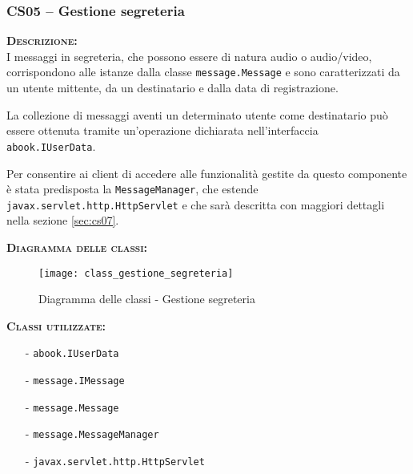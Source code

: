 \subsubsection{CS05 -- Gestione segreteria}\label{sec:cs05}
\begin{description}
	\item{\scshape\bfseries Descrizione:}\\
I messaggi in segreteria, che possono essere di natura audio o audio/video, corrispondono alle istanze dalla classe \texttt{message.Message} e sono caratterizzati da un utente mittente, da un destinatario e dalla data di registrazione.

La collezione di messaggi aventi un determinato utente come destinatario può essere ottenuta tramite un'operazione dichiarata nell'interfaccia \texttt{abook.IUserData}.

Per consentire ai client di accedere alle funzionalità gestite da questo componente è stata predisposta la  \texttt{MessageManager}, che estende \texttt{javax.servlet.http.HttpServlet} e che sarà descritta con maggiori dettagli nella sezione \vref{sec:cs07}.

	\item{\scshape\bfseries Diagramma delle classi:}
\begin{figure}[H]
  \centering
  \texttt{[image: class\_gestione\_segreteria]}
  \caption{Diagramma delle classi - Gestione segreteria}\label{fig:gestionesegreteria}
\end{figure}	
	
	\item{\scshape\bfseries Classi utilizzate:}
	\begin{itemize}[noitemsep,nolistsep]
	  \item[-] \texttt{abook.IUserData}
		\item[-] \texttt{message.IMessage}
	  \item[-] \texttt{message.Message}
	  \item[-] \texttt{message.MessageManager}
	  \item[-] \texttt{javax.servlet.http.HttpServlet}
	\end{itemize}
\end{description}

